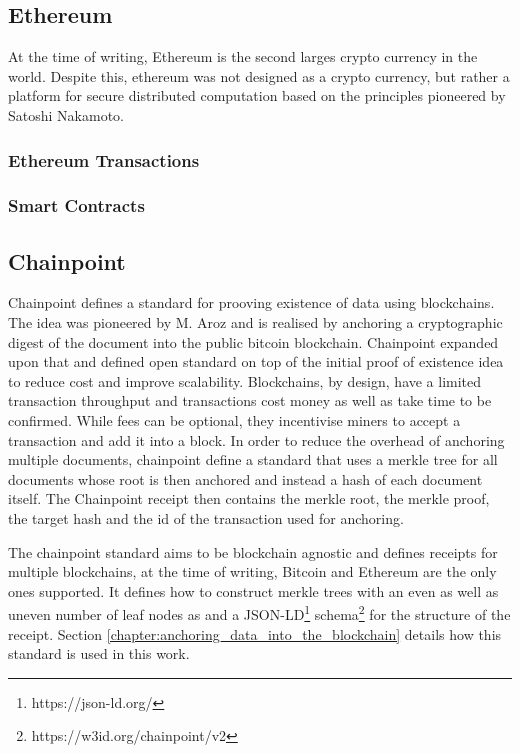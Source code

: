 \documentclass[12pt,msc,a4paper,oneside]{ucl_thesis}
\begin{document}
\subsection{Ethereum} \label{sec:background_ethereum}
At the time of writing, Ethereum is the second larges crypto currency in the world. Despite this, ethereum was not designed as a crypto currency, but rather a platform for secure distributed computation based on the principles pioneered by Satoshi Nakamoto. 
\subsubsection{Ethereum Transactions}
\subsubsection{Smart Contracts}

\subsection{Chainpoint} \label{sec:literature_chainpoint}
Chainpoint defines a standard for prooving existence of data using blockchains. The idea was pioneered by M. Aroz \cite{proof_of_existence} and is realised by anchoring a cryptographic digest of the document into the public bitcoin blockchain. Chainpoint expanded upon that and defined open standard on top of the initial proof of existence idea to reduce cost and improve scalability.
Blockchains, by design, have a limited transaction throughput and transactions cost money as well as take time to be confirmed. While fees can be optional, they incentivise miners to accept a transaction and add it into a block. In order to reduce the overhead of anchoring multiple documents, chainpoint define a standard that uses a merkle tree for all documents whose root is then anchored and instead a hash of each document itself. The Chainpoint receipt then contains the merkle root, the merkle proof, the target hash and the id of the transaction used for anchoring.

The chainpoint standard aims to be blockchain agnostic and defines receipts for multiple blockchains, at the time of writing, Bitcoin and Ethereum are the only ones supported. It defines how to construct merkle trees with an even as well as uneven number of leaf nodes as and a JSON-LD\footnote{https://json-ld.org/} schema\footnote{https://w3id.org/chainpoint/v2} for the structure of the receipt. Section \ref{chapter:anchoring_data_into_the_blockchain} details how this standard is used in this work.
\end{document}
